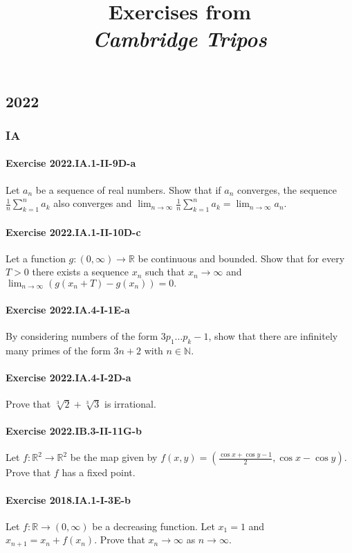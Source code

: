 \documentclass{article}
\title{\textbf{
Exercises from \\
\textit{Cambridge Tripos}
}}
\date{}
\begin{document}
\maketitle

\subsection*{2022}
\subsubsection*{IA}
\paragraph{Exercise 2022.IA.1-II-9D-a} Let $a_{n}$ be a sequence of real numbers. Show that if $a_{n}$ converges, the sequence $\frac{1}{n} \sum_{k=1}^{n} a_{k}$ also converges and $\lim _{n \rightarrow \infty} \frac{1}{n} \sum_{k=1}^{n} a_{k}=\lim _{n \rightarrow \infty} a_{n}$.

\paragraph{Exercise 2022.IA.1-II-10D-c} Let a function $g:(0, \infty) \rightarrow \mathbb{R}$ be continuous and bounded. Show that for every $T>0$ there exists a sequence $x_{n}$ such that $x_{n} \rightarrow \infty$ and $\lim _{n \rightarrow \infty}\left(g\left(x_{n}+T\right)-g\left(x_{n}\right)\right)=0 .$

\paragraph{Exercise 2022.IA.4-I-1E-a} By considering numbers of the form $3 p_{1} \ldots p_{k}-1$, show that there are infinitely many primes of the form $3 n+2$ with $n \in \mathbb{N}$.

\paragraph{Exercise 2022.IA.4-I-2D-a} Prove that $\sqrt[3]{2}+\sqrt[3]{3}$ is irrational.

\paragraph{Exercise 2022.IB.3-II-11G-b} Let $f: \mathbb{R}^{2} \rightarrow
\mathbb{R}^{2}$ be the map given by $f(x, y)=\left(\frac{\cos x+\cos y-1}{2},
\cos x-\cos y\right)$. Prove that $f$ has a fixed point.

\paragraph{Exercise 2018.IA.1-I-3E-b} Let $f: \mathbb{R} \rightarrow(0, \infty)$ be a decreasing function. Let $x_{1}=1$ and $x_{n+1}=x_{n}+f\left(x_{n}\right)$. Prove that $x_{n} \rightarrow \infty$ as $n \rightarrow \infty$.
\end{document}
